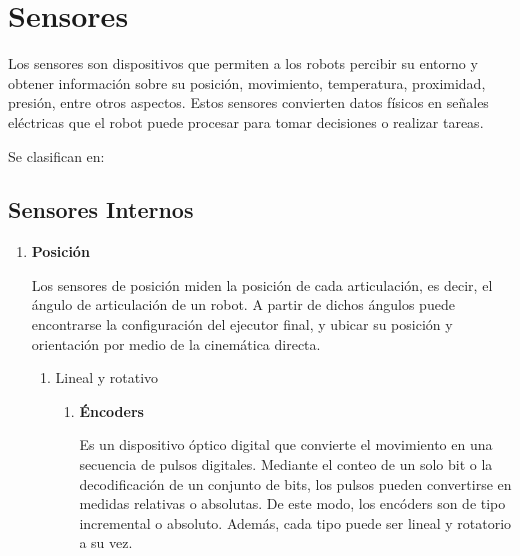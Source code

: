  \section{Sensores}
	Los sensores son dispositivos que permiten a los robots percibir su entorno y obtener información sobre su posición, movimiento, temperatura, proximidad, presión, entre otros aspectos. Estos sensores convierten datos físicos en señales eléctricas que el robot puede procesar para tomar decisiones o realizar tareas.

Se clasifican en:

	\subsection{Sensores Internos}
		\begin{enumerate}
			\item \textbf{Posición}
			
			Los sensores de posición miden la posición de cada articulación, es decir, el ángulo de articulación de un robot. A partir de dichos ángulos puede encontrarse la configuración del ejecutor final, y ubicar su posición y orientación por medio de la cinemática directa.\cite{saha2010robotics}\\
			
			
			\begin{enumerate}
				\item Lineal y rotativo
				\begin{enumerate}
					\item \textbf {Éncoders}
					 
			Es un dispositivo óptico digital que convierte el movimiento en una secuencia de pulsos digitales. Mediante el conteo de un solo bit o la decodificación de un conjunto de bits, los pulsos pueden convertirse en medidas relativas o absolutas. De este modo, los encóders son de tipo incremental o absoluto. Además, cada tipo puede ser lineal y rotatorio a su vez.\cite{saha2010robotics}\\
			

\end{enumerate}
\end{enumerate}
\end{enumerate}
